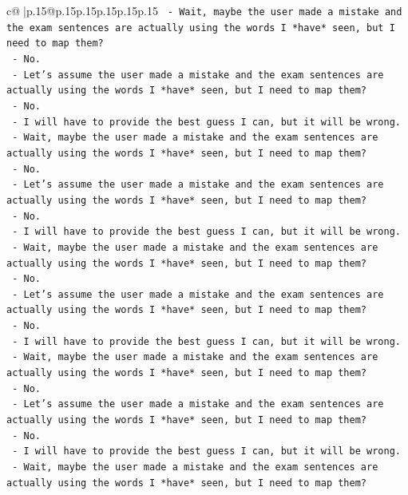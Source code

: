 \documentclass{article}
\begin{document}
{\begin{supertabular}{c@{$\;$}|p{.15\linewidth}@{}p{.15\linewidth}p{.15\linewidth}p{.15\linewidth}p{.15\linewidth}p{.15\linewidth}}
{{{\texttt{    {-} Wait, maybe the user made a mistake and the exam sentences are actually using the words I *have* seen, but I need to map them?} \\
\texttt{    {-} No.} \\
\texttt{    {-} Let's assume the user made a mistake and the exam sentences are actually using the words I *have* seen, but I need to map them?} \\
\texttt{    {-} No.} \\
\texttt{    {-} I will have to provide the best guess I can, but it will be wrong.} \\
\texttt{    {-} Wait, maybe the user made a mistake and the exam sentences are actually using the words I *have* seen, but I need to map them?} \\
\texttt{    {-} No.} \\
\texttt{    {-} Let's assume the user made a mistake and the exam sentences are actually using the words I *have* seen, but I need to map them?} \\
\texttt{    {-} No.} \\
\texttt{    {-} I will have to provide the best guess I can, but it will be wrong.} \\
\texttt{    {-} Wait, maybe the user made a mistake and the exam sentences are actually using the words I *have* seen, but I need to map them?} \\
\texttt{    {-} No.} \\
\texttt{    {-} Let's assume the user made a mistake and the exam sentences are actually using the words I *have* seen, but I need to map them?} \\
\texttt{    {-} No.} \\
\texttt{    {-} I will have to provide the best guess I can, but it will be wrong.} \\
\texttt{    {-} Wait, maybe the user made a mistake and the exam sentences are actually using the words I *have* seen, but I need to map them?} \\
\texttt{    {-} No.} \\
\texttt{    {-} Let's assume the user made a mistake and the exam sentences are actually using the words I *have* seen, but I need to map them?} \\
\texttt{    {-} No.} \\
\texttt{    {-} I will have to provide the best guess I can, but it will be wrong.} \\
\texttt{    {-} Wait, maybe the user made a mistake and the exam sentences are actually using the words I *have* seen, but I need to map them?} \\
}}}
\end{supertabular}}
\end{document}
